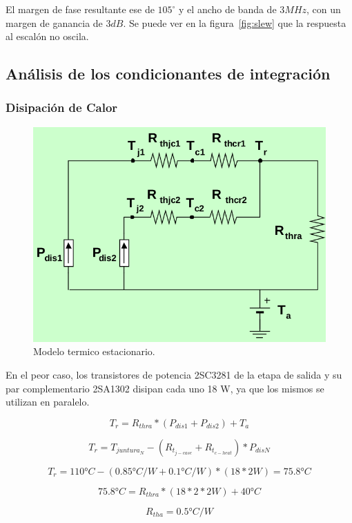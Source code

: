 \documentclass[a4paper,12pt,twoside]{article}
\begin{document}
El margen de fase resultante ese de $105^{\circ}$ y el ancho de banda de $3MHz$, con un margen de ganancia de $3dB$. Se puede ver en la figura~\ref{fig:slew} que la respuesta al escalón no oscila.


\subsection{Análisis de los condicionantes de integración}

\subsubsection{Disipación de Calor}
\begin{figure}[H]
    \centering
    \includegraphics[height=0.4\textwidth]{img/calculo_disipador}
    \caption{Modelo termico estacionario.}
    \label{fig:disipadores}
\end{figure}

En el peor caso, los transistores de potencia 2SC3281 de la etapa de salida y su par complementario 2SA1302
disipan cada uno 18 W, ya que los mismos se utilizan en paralelo.

\begin{equation*}
T_r = R_{thra} * (P_{dis1}+P_{dis2}) + T_a
\end{equation*}

\begin{equation*}
T_r = T_{juntura_{N}} - (R_{t_{j-case}}+R_{t_{c-heat}})*P_{disN}
\end{equation*}

\begin{equation*}
T_r = 110°C - (0.85 °C/W + 0.1 °C/W)*(18*2 W) = 75.8 °C
\end{equation*}

\begin{equation*}
75.8°C = R_{thra}*(18*2*2 W) + 40°C
\end{equation*}

\begin{equation*}
R_{tha} = 0.5 °C/W
\end{equation*}
\end{document}

